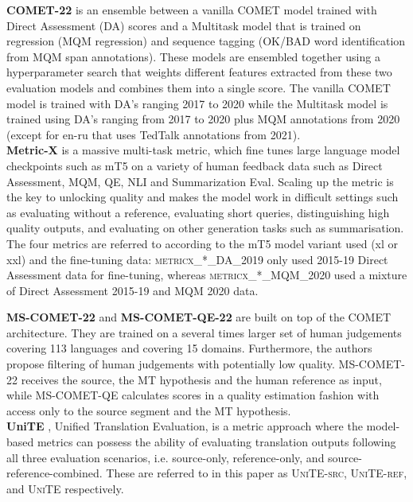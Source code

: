 \documentclass[11pt]{article}
\begin{document}
\noindent \textbf{COMET-22} \citep{COMET:WMT22} is an ensemble between a vanilla \textsc{COMET} model trained with Direct Assessment (DA) scores  and a Multitask model that is trained on regression (MQM regression) and sequence tagging (OK/BAD word identification from MQM span annotations). These models are ensembled together using a hyperparameter search that weights different features extracted from these two evaluation models and combines them into a single score.
The vanilla \textsc{COMET} model is trained with DA’s ranging 2017 to 2020 while the Multitask model is trained using DA’s ranging from 2017 to 2020 plus MQM annotations from 2020 (except for en-ru that uses TedTalk annotations from 2021).\\

\noindent \textbf{Metric-X} is a massive multi-task metric, which fine tunes large language model checkpoints such as mT5 on a variety of human feedback data such as Direct Assessment, MQM, QE, NLI and Summarization Eval. Scaling up the metric is the key to unlocking quality and makes the model work in difficult settings such as evaluating without a reference, evaluating short queries, distinguishing high quality outputs, and evaluating on other generation tasks such as summarisation. The four metrics are referred to according to the mT5 model variant used (xl or xxl) and the fine-tuning data: \textsc{metricx\_*\_DA\_2019} only used 2015-19 Direct Assessment data for fine-tuning, whereas \textsc{metricx\_*\_MQM\_2020} used a mixture of Direct Assessment 2015-19 and MQM 2020 data.

\noindent \textbf{MS-COMET-22} and \textbf{MS-COMET-QE-22} \citep{MS-COMET:WMT22} are built on top of the COMET \citep{rei-etal-2020-comet} architecture. They are trained on a several times larger set of human judgements covering 113 languages and covering 15 domains. Furthermore, the authors propose filtering of human judgements with potentially low quality. \textsc{MS-COMET-22} receives the source, the MT hypothesis and the human reference as input, while  \textsc{MS-COMET-QE} calculates scores in a quality estimation fashion with access only to the source segment and the MT hypothesis.\\

\noindent \textbf{UniTE} \citep{UNITE:WMT22}, Unified Translation Evaluation, is a metric approach where the model-based metrics can possess the ability of evaluating translation outputs following all three evaluation scenarios, i.e. source-only, reference-only, and source-reference-combined. These are referred to in this paper as \textsc{UniTE-src}, \textsc{UniTE-ref}, and \textsc{UniTE} respectively. \\
\end{document}
